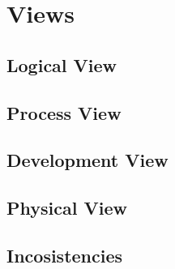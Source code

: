 \section{Views}
	\subsection{Logical View}
	
	\subsection{Process View}
	
	\subsection{Development View}
	
	\subsection{Physical View}
	
	\subsection{Incosistencies}
